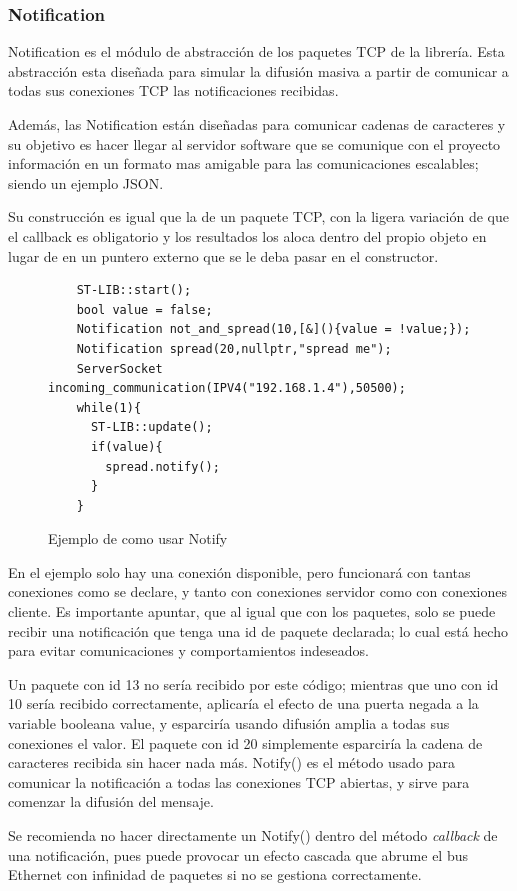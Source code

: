 \documentclass{report}
\begin{document}
\subsubsection{Notification}
Notification es el módulo de abstracción de los paquetes TCP de la librería. Esta abstracción esta diseñada para simular la difusión masiva a partir de comunicar a todas sus conexiones TCP las notificaciones recibidas. \par
Además, las Notification están diseñadas para comunicar cadenas de caracteres y su objetivo es hacer llegar al servidor software que se comunique con el proyecto información en un formato mas amigable para las comunicaciones escalables; siendo un ejemplo JSON.
 \par \vspace{0.3cm}
Su construcción es igual que la de un paquete TCP, con la ligera variación de que el callback es obligatorio y los resultados los aloca dentro del propio objeto en lugar de en un puntero externo que se le deba pasar en el constructor. 
\begin{figure}[h]
  \begin{lstlisting}
    ST-LIB::start();
    bool value = false;
    Notification not_and_spread(10,[&](){value = !value;});
    Notification spread(20,nullptr,"spread me");
    ServerSocket incoming_communication(IPV4("192.168.1.4"),50500);
    while(1){
      ST-LIB::update();
      if(value){
        spread.notify();
      }
    }
  \end{lstlisting}
  \caption{Ejemplo de como usar Notify}
  \label{NotifyCode}
\end{figure}
\par \vspace{0.3cm}
En el ejemplo solo hay una conexión disponible, pero funcionará con tantas conexiones como se declare, y tanto con conexiones servidor como con conexiones cliente. Es importante apuntar, que al igual que con los paquetes, solo se puede recibir una notificación que tenga una id de paquete declarada; lo cual está hecho para evitar comunicaciones y comportamientos indeseados. \par 
Un paquete con id 13 no sería recibido por este código; mientras que uno con id 10 sería recibido correctamente, aplicaría el efecto de una puerta negada a la variable booleana value, y esparciría usando difusión amplia a todas sus conexiones el valor. El paquete con id 20 simplemente esparciría la cadena de caracteres recibida sin hacer nada más. Notify() es el método usado para comunicar la notificación a todas las conexiones TCP abiertas, y sirve para comenzar la difusión del mensaje. \par \vspace{0.3cm}
Se recomienda no hacer directamente un Notify() dentro del método \textit{callback} de una notificación, pues puede provocar un efecto cascada que abrume el bus Ethernet con infinidad de paquetes si no se gestiona correctamente.  
\end{document}
